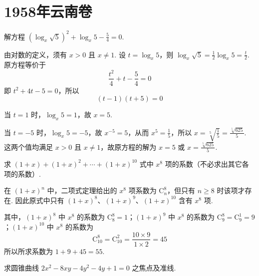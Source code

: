 \chapter{1958年云南卷}

\begin{problem}
解方程 \(\left(\log_{x}\sqrt{5}\right)^{2}+\log_{x}5-\frac{5}{4}=0\).
\end{problem}

\begin{solution}
由对数的定义，须有 \(x>0\) 且 \(x\ne1\). 设 \(t=\log_{x}5\)，则
\(\log_{x}\sqrt{5}=\frac{1}{2}\log_{x}5=\frac{t}{2}\). 原方程等价于
\[
\frac{t^{2}}{4}+t-\frac{5}{4}=0
\]
即 \(t^{2}+4t-5=0\)，所以
\[
(t-1)(t+5)=0
\]

当 \(t=1\) 时，\(\log_{x}5=1\)，故 \(x=5\).

当 \(t=-5\) 时，\(\log_{x}5=-5\)，故 \(x^{-5}=5\)，从而 \(x^{5}=\frac{1}{5}\)，所以 \(x=\sqrt[5]{\frac{1}{5}}=\frac{\sqrt[5]{625}}{5}\). 这两个值均满足 \(x>0\) 且 \(x\ne1\)，故原方程的解为
\(x=5\) 或 \(x=\frac{\sqrt[5]{625}}{5}\).
\end{solution}

\begin{problem}
求 \((1+x)+(1+x)^{2}+\cdots +(1+x)^{10}\) 式中 \(x^{8}\) 项的系数（不必求出其它各项的系数）.
\end{problem}

\begin{solution}
在 \((1+x)^{n}\) 中，二项式定理给出的 \(x^{8}\) 项系数为 \(\mathrm C_{n}^{8}\)，但只有 \(n\ge8\) 时该项才存在. 因此原式中只有 \((1+x)^{8}\)、\((1+x)^{9}\)、\((1+x)^{10}\) 含有 \(x^{8}\) 项.

其中，\((1+x)^{8}\) 中 \(x^{8}\) 的系数为 \(\mathrm C_{8}^{8}=1\)；\((1+x)^{9}\) 中 \(x^{8}\) 的系数为 \(\mathrm C_{9}^{8}=\mathrm C_{9}^{1}=9\)；\((1+x)^{10}\) 中 \(x^{8}\) 的系数为
\[
\mathrm C_{10}^{8}=\mathrm C_{10}^{2}=\frac{10\times9}{1\times2}=45
\]
所以所求系数为 \(1+9+45=55\).
\end{solution}

\begin{problem}
求圆锥曲线 \(2x^{2}-8xy-4y^{2}-4y+1=0\) 之焦点及准线.
\end{problem}

